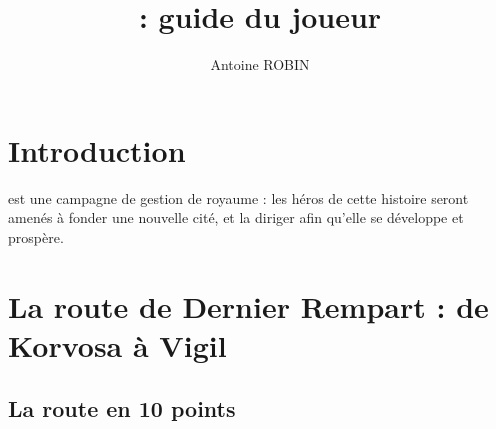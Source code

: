 \documentclass[letterpaper,10pt,twoside,twocolumn,openany]{book}
\title{\nomcampagne : guide du joueur}
\date{}
\author{Antoine ROBIN}
\begin{document}
\maketitle
\tableofcontents
\chapter{Introduction}
\nomcampagne est une campagne de gestion de royaume : les héros de cette histoire seront amenés à fonder une nouvelle cité, et la diriger afin qu'elle se développe et prospère.
\chapter{La route de Dernier Rempart : de Korvosa à Vigil}
\section{La route en 10 points}
\end{document}
